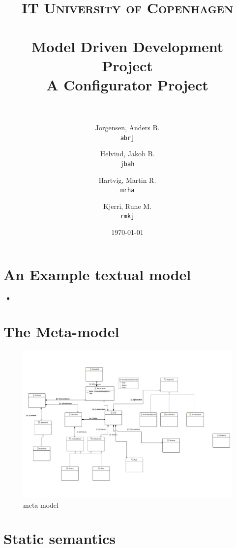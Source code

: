 \documentclass[paper=a4, fontsize=11pt]{scrartcl} %
\title{	
\normalfont \normalsize 
\textsc{IT University of Copenhagen} \\ [25pt] %
\horrule{0.5pt} \\[0.4cm] %
\huge Model Driven Development Project \\ %
\large A Configurator Project \\ %
\horrule{2pt} \\[0.5cm] %
}
\author{
  Jorgensen, Anders B.\\
  \texttt{abrj}
  \and
  Helvind, Jakob B.\\
  \texttt{jbah}
  \and
  Hartvig, Martin R.\\
  \texttt{mrha}
  \and
  Kjerri, Rune M.\\
  \texttt{rmkj}
}
\date{\normalsize\today} %
\numberwithin{equation}{section} %
\numberwithin{figure}{section} %
\numberwithin{table}{section} %
\newcommand{\java}[2]{
\begin{itemize}
\item[]
\end{itemize}
}
\begin{document}
\maketitle %
\newpage


\section{An Example textual model}
\java{../configproject/runtime-CarFactory/src/factory.smdpdsl}{Concrete syntax}

\section{The Meta-model}

\begin{figure}[ht!]
\centering
\includegraphics[scale=0.7]{pictures/mrha.pdf}
\caption{meta model}
\end{figure}

\section{Static semantics}
\end{document}
